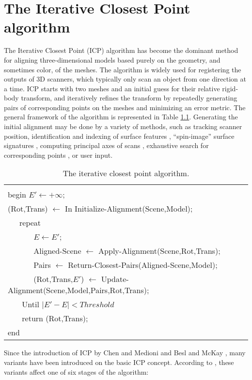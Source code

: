 \chapter{The Iterative Closest Point algorithm} \label{apx_icp}

The Iterative Closest Point (ICP) algorithm has become the dominant
method for aligning three-dimensional models based purely on the
geometry, and sometimes color, of the meshes. The algorithm is
widely used for registering the outputs of 3D scanners, which
typically only scan an object from one direction at a time. ICP
starts with two meshes and an initial guess for their relative
rigid-body transform, and iteratively refines the transform by
repeatedly generating pairs of corresponding points on the meshes
and minimizing an error metric. The general framework of the
algorithm is represented in Table \ref{tab_icp}. Generating the
initial alignment may be done by a variety of methods, such as
tracking scanner position, identification and indexing of surface
features \cite{Faugeras86,Stein92}, ``spin-image'' surface
signatures \cite{Johnson97, Huber01}, computing principal axes of
scans \cite{Dorai97}, exhaustive search for corresponding points
\cite{Chen99}, or user input.
\begin{table}[tbp]
\begin{tabular}{|l|}
\hline
\\
 begin $E' \leftarrow + \infty$; \\
(Rot,Trans) $\leftarrow$ In Initialize-Alignment(Scene,Model);\\
~~~repeat\\
~~~~~~ $E \leftarrow E'$;\\
~~~~~~ Aligned-Scene $\leftarrow$
Apply-Alignment(Scene,Rot,Trans);\\
~~~~~~ Pairs $\leftarrow$ Return-Closest-Pairs(Aligned-Scene,Model);\\
~~~~~~ (Rot,Trans,$E'$) $\leftarrow$
Update-Alignment(Scene,Model,Pairs,Rot,Trans); \\
~~~ Until $|E'- E| < Threshold$ \\
~~~ return (Rot,Trans); \\
end\\
\hline
\end{tabular}
\caption{The iterative closest point algorithm.}\label{tab_icp}
\end{table}

Since the introduction of ICP by Chen and Medioni \cite{Chen91} and
Besl and McKay \cite{besl92}, many variants have been introduced on
the basic ICP concept. According to \cite{Rusinkiewicz_01}, these
variants affect one of six stages of the algorithm:

